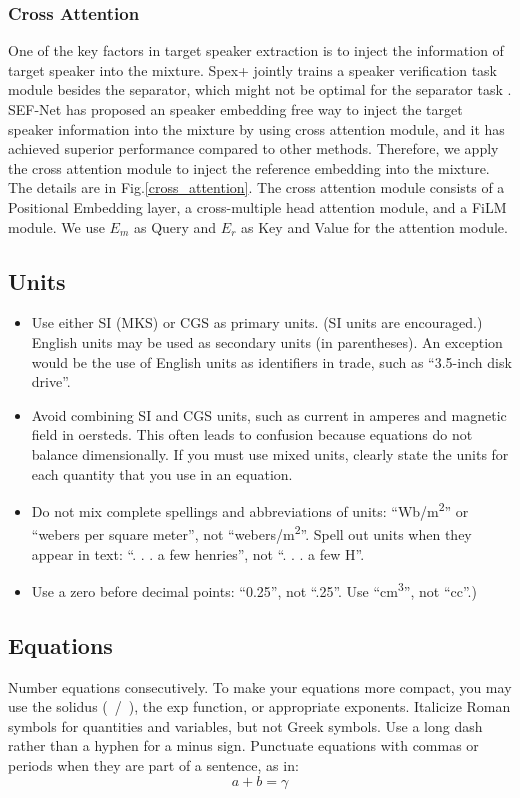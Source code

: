 \documentclass[conference]{IEEEtran}
\begin{document}
\subsubsection{Cross Attention}
One of the key factors in target speaker extraction is to 
inject the information of target speaker 
into the mixture. Spex+ \cite{spex_plus} jointly trains a speaker verification task module 
besides the separator, which might not be optimal for the separator task \cite{sef_net}. SEF-Net \cite{sef_net} has proposed an speaker embedding free way to inject the 
target speaker information into the mixture by using cross attention module, and it has 
achieved superior performance compared to other methods. Therefore, we apply 
the cross attention module to inject the reference embedding into the mixture. The details 
are in Fig.\ref{cross_attention}.
The cross attention module consists of a Positional 
Embedding layer, a cross-multiple head attention module, 
and a FiLM module. 
We use \(E_m\) as Query and \(E_r\) as Key and Value for 
the attention module. 


\subsection{Units}
\begin{itemize}
\item Use either SI (MKS) or CGS as primary units. (SI units are encouraged.) English units may be used as secondary units (in parentheses). An exception would be the use of English units as identifiers in trade, such as ``3.5-inch disk drive''.
\item Avoid combining SI and CGS units, such as current in amperes and magnetic field in oersteds. This often leads to confusion because equations do not balance dimensionally. If you must use mixed units, clearly state the units for each quantity that you use in an equation.
\item Do not mix complete spellings and abbreviations of units: ``Wb/m\textsuperscript{2}'' or ``webers per square meter'', not ``webers/m\textsuperscript{2}''. Spell out units when they appear in text: ``. . . a few henries'', not ``. . . a few H''.
\item Use a zero before decimal points: ``0.25'', not ``.25''. Use ``cm\textsuperscript{3}'', not ``cc''.)
\end{itemize}

\subsection{Equations}
Number equations consecutively. To make your 
equations more compact, you may use the solidus (~/~), the exp function, or 
appropriate exponents. Italicize Roman symbols for quantities and variables, 
but not Greek symbols. Use a long dash rather than a hyphen for a minus 
sign. Punctuate equations with commas or periods when they are part of a 
sentence, as in:
\begin{equation}
a+b=\gamma\label{eq}
\end{equation}
\end{document}
